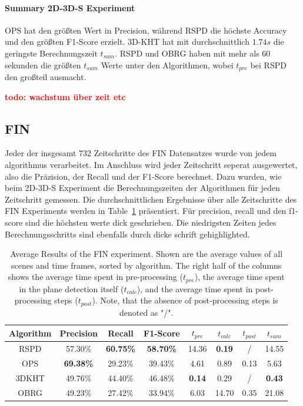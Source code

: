 \documentclass[main.tex]{subfiles}
\begin{document}
\paragraph{Summary 2D-3D-S Experiment}
OPS hat den größten Wert in Precision, während RSPD die höchste Accuracy und den größten F1-Score erzielt.
3D-KHT hat mit durchschnittlich $1.74s$ die geringste Berechnungszeit $t_{sum}$. RSPD und OBRG haben mit mehr als 60 sekunden
die größten $t_{sum}$ Werte unter den Algorithmen, wobei $t_{pre}$ bei RSPD den großteil ausmacht.

\textbf{\textcolor{red}{todo: wachstum über zeit etc}}

\subsection{FIN}
Jeder der insgesamt 732 Zeitschritte des FIN Datensatzes wurde von jedem algorithmus verarbeitet. Im Anschluss wird
jeder Zeitschritt seperat ausgewertet, also die Präzision, der Recall und der F1-Score berechnet. Dazu
wurden, wie beim 2D-3D-S Experiment die Berechnungszeiten der Algorithmen für jeden Zeitschritt gemessen.
Die durchschnittlichen Ergebnisse über alle Zeitschritte des FIN Experiments werden
in Table~\ref{tab:res-fin-total} präsentiert. Für precision, recall und den f1-score sind die höchsten werte dick geschrieben.
Die niedrigsten Zeiten jedes Berechnungsschritts sind ebenfalls durch dicke schrift gehighlighted.


\begin{table}[H]
    \centering
    \begin{tabular}{c|cccccc|c}
        Algorithm & Precision        & Recall           & F1-Score         & $t_{pre}$     & $t_{calc}$    & $t_{post}$ & $t_{sum}$     \\ \hline
        RSPD      & 57.30\%          & \textbf{60.75\%} & \textbf{58.70\%} & 14.36         & \textbf{0.19} & /          & 14.55         \\
        OPS       & \textbf{69.38\%} & 29.23\%          & 39.43\%          & 4.61          & 0.89          & 0.13       & 5.63          \\
        3DKHT     & 49.76\%          & 44.40\%          & 46.48\%          & \textbf{0.14} & 0.29          & /          & \textbf{0.43} \\
        OBRG      & 49.23\%          & 27.42\%          & 33.94\%          & 6.03          & 14.70         & 0.35       & 21.08
    \end{tabular}
    \caption[Average FIN Results]{Average Results of the FIN experiment. Shown are the average values of all scenes and time frames, sorted by
        algorithm. The right half of the columns shows the average time spent in pre-processing ($t_{pre}$), the average time spent in the plane
        detection itself ($t_{calc}$), and the average time spent in post-processing steps ($t_{post}$).
        Note, that the absence of post-processing steps is denoted as "/".}
    \label{tab:res-fin-total}
\end{table}
\end{document}
